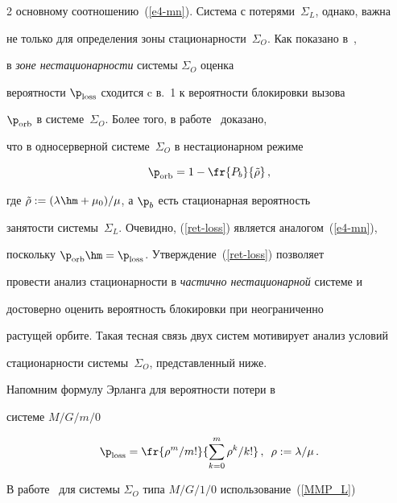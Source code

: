 \begin{multicols}{2}
основному соотношению~(\ref{e4-mn}). Сис\-те\-ма с потерями~$ \Sigma_L $, однако, важна


не только для определения зоны стационарности~$\Sigma_O$. Как показано в~\cite{Minsk, GM}, 


в {\it зоне нестационарности} системы $\Sigma_O$ оценка


вероятности $\p_{\mathrm{loss}}$ сходится c в.~1 к вероятности блокировки вызова


$\p_{\mathrm{orb}}$ в сис\-те\-ме~$\Sigma_O$. Более того, в работе~\cite{MorNek} доказано,


что в односерверной сис\-те\-ме~$\Sigma_O$ в нестационарном режиме 


\begin{equation}


\label{ret-loss} 


\p_{\mathrm{orb}}=1-\fr{P_b}{\tilde{\rho}}\,, 


\end{equation} 


где $\tilde{\rho}:=(\lambda\hm+ \mu_0)/\mu $, а $\p_b$ есть стационарная веро\-ятность


занятости системы~$\Sigma_L $. Очевидно, (\ref{ret-loss}) является  аналогом~(\ref{e4-mn}), 


поскольку $\p_{\mathrm{orb}}\hm=\p_{\mathrm{loss}}$. Утверждение~(\ref{ret-loss})  поз\-во\-ля\-ет


провести анализ стационарности в {\it частично нестационарной} сис\-те\-ме и


достоверно оценить вероятность блокировки при неограниченно


растущей орбите. Такая тесная связь двух систем мотивирует анализ условий


стационарности системы~$\Sigma_O$, представленный ниже.





 Напомним формулу Эрланга для вероятности потери  в


 системе $M/G/m/0$~ \cite{Gnedenko}


\begin{equation} 


\label{MMP_L}


 \p_{\mathrm{loss}}=\fr{\rho^{m}/m!}{\sum\limits_{k=0}^m \rho^k/k!}\,,\enskip\rho:=\lambda/\mu\,.


\end{equation}


 В работе~\cite{MorNek} для системы $\Sigma_O$ типа $M/G/1/0 $  использование~(\ref{MMP_L})



\end{multicols}
